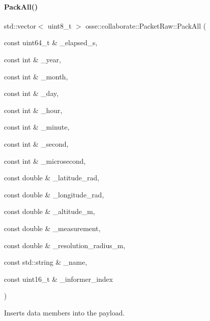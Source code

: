 \paragraph{\texorpdfstring{Pack\+All()}{PackAll()}}
{\footnotesize\ttfamily std\+::vector$<$ uint8\+\_\+t $>$ osse\+::collaborate\+::\+Packet\+Raw\+::\+Pack\+All (\begin{DoxyParamCaption}\item[{const uint64\+\_\+t \&}]{\+\_\+elapsed\+\_\+s,  }\item[{const int \&}]{\+\_\+year,  }\item[{const int \&}]{\+\_\+month,  }\item[{const int \&}]{\+\_\+day,  }\item[{const int \&}]{\+\_\+hour,  }\item[{const int \&}]{\+\_\+minute,  }\item[{const int \&}]{\+\_\+second,  }\item[{const int \&}]{\+\_\+microsecond,  }\item[{const double \&}]{\+\_\+latitude\+\_\+rad,  }\item[{const double \&}]{\+\_\+longitude\+\_\+rad,  }\item[{const double \&}]{\+\_\+altitude\+\_\+m,  }\item[{const double \&}]{\+\_\+measurement,  }\item[{const double \&}]{\+\_\+resolution\+\_\+radius\+\_\+m,  }\item[{const std\+::string \&}]{\+\_\+name,  }\item[{const uint16\+\_\+t \&}]{\+\_\+informer\+\_\+index }\end{DoxyParamCaption})\hspace{0.3cm}{\ttfamily [private]}}



Inserts data members into the payload. 


